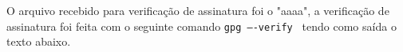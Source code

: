 \documentclass[
    article,            %
    11pt,               %
    oneside,            %
    a4paper,            %
    english,            %
    brazil,             %
    sumario=tradicional,
    ]{abntex2}
\begin{document}
O arquivo recebido para verificação de assinatura foi o "aaaa", a verificação de assinatura foi feita com o seguinte comando \texttt{gpg ----verify } tendo como saída o texto abaixo.

\begin{Verbatim}[frame=single, commandchars=\\\{\}, fontsize=\footnotesize]

\end{Verbatim}



% 


\postextual

\nocite{GnuPrivacyGuardHowto}
\nocite{subkeys_debian}
\nocite{Stallings:2010:CNS:1824151}

\end{document}

